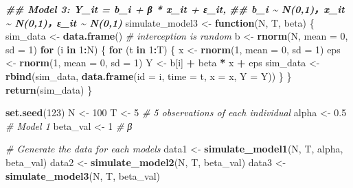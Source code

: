 \documentclass[
]{article}
\newenvironment{Shaded}{\begin{snugshade}}{\end{snugshade}}
\newcommand{\AttributeTok}[1]{\textcolor[rgb]{0.13,0.29,0.53}{#1}}
\newcommand{\CommentTok}[1]{\textcolor[rgb]{0.56,0.35,0.01}{\textit{#1}}}
\newcommand{\ControlFlowTok}[1]{\textcolor[rgb]{0.13,0.29,0.53}{\textbf{#1}}}
\newcommand{\DecValTok}[1]{\textcolor[rgb]{0.00,0.00,0.81}{#1}}
\newcommand{\DocumentationTok}[1]{\textcolor[rgb]{0.56,0.35,0.01}{\textbf{\textit{#1}}}}
\newcommand{\FloatTok}[1]{\textcolor[rgb]{0.00,0.00,0.81}{#1}}
\newcommand{\FunctionTok}[1]{\textcolor[rgb]{0.13,0.29,0.53}{\textbf{#1}}}
\newcommand{\NormalTok}[1]{#1}
\newcommand{\OtherTok}[1]{\textcolor[rgb]{0.56,0.35,0.01}{#1}}
\newcommand{\SpecialCharTok}[1]{\textcolor[rgb]{0.81,0.36,0.00}{\textbf{#1}}}
\begin{document}
\begin{Shaded}
\begin{Highlighting}[]
\DocumentationTok{\#\# Model 3: Y\_it = b\_i + β * x\_it + ε\_it,}
\DocumentationTok{\#\# b\_i \textasciitilde{} N(0,1)，x\_it \textasciitilde{} N(0,1)，ε\_it \textasciitilde{} N(0,1)}
\NormalTok{simulate\_model3 }\OtherTok{\textless{}{-}} \ControlFlowTok{function}\NormalTok{(N, T, beta) \{}
\NormalTok{  sim\_data }\OtherTok{\textless{}{-}} \FunctionTok{data.frame}\NormalTok{()}
  \CommentTok{\# interception is random }
\NormalTok{  b }\OtherTok{\textless{}{-}} \FunctionTok{rnorm}\NormalTok{(N, }\AttributeTok{mean =} \DecValTok{0}\NormalTok{, }\AttributeTok{sd =} \DecValTok{1}\NormalTok{)}
  \ControlFlowTok{for}\NormalTok{ (i }\ControlFlowTok{in} \DecValTok{1}\SpecialCharTok{:}\NormalTok{N) \{}
    \ControlFlowTok{for}\NormalTok{ (t }\ControlFlowTok{in} \DecValTok{1}\SpecialCharTok{:}\NormalTok{T) \{}
\NormalTok{      x }\OtherTok{\textless{}{-}} \FunctionTok{rnorm}\NormalTok{(}\DecValTok{1}\NormalTok{, }\AttributeTok{mean =} \DecValTok{0}\NormalTok{, }\AttributeTok{sd =} \DecValTok{1}\NormalTok{)}
\NormalTok{      eps }\OtherTok{\textless{}{-}} \FunctionTok{rnorm}\NormalTok{(}\DecValTok{1}\NormalTok{, }\AttributeTok{mean =} \DecValTok{0}\NormalTok{, }\AttributeTok{sd =} \DecValTok{1}\NormalTok{)}
\NormalTok{      Y }\OtherTok{\textless{}{-}}\NormalTok{ b[i] }\SpecialCharTok{+}\NormalTok{ beta }\SpecialCharTok{*}\NormalTok{ x }\SpecialCharTok{+}\NormalTok{ eps}
\NormalTok{      sim\_data }\OtherTok{\textless{}{-}} \FunctionTok{rbind}\NormalTok{(sim\_data, }\FunctionTok{data.frame}\NormalTok{(}\AttributeTok{id =}\NormalTok{ i, }\AttributeTok{time =}\NormalTok{ t, }\AttributeTok{x =}\NormalTok{ x, }\AttributeTok{Y =}\NormalTok{ Y))}
\NormalTok{    \}}
\NormalTok{  \}}
  \FunctionTok{return}\NormalTok{(sim\_data)}
\NormalTok{\}}

\FunctionTok{set.seed}\NormalTok{(}\DecValTok{123}\NormalTok{)}
\NormalTok{N }\OtherTok{\textless{}{-}} \DecValTok{100}  
\NormalTok{T }\OtherTok{\textless{}{-}} \DecValTok{5}    \CommentTok{\#  5 observations of each individual}
\NormalTok{alpha }\OtherTok{\textless{}{-}} \FloatTok{0.5}  \CommentTok{\# Model 1 }
\NormalTok{beta\_val }\OtherTok{\textless{}{-}} \DecValTok{1}  \CommentTok{\# β }

\CommentTok{\# Generate the data for each models}
\NormalTok{data1 }\OtherTok{\textless{}{-}} \FunctionTok{simulate\_model1}\NormalTok{(N, T, alpha, beta\_val)}
\NormalTok{data2 }\OtherTok{\textless{}{-}} \FunctionTok{simulate\_model2}\NormalTok{(N, T, beta\_val)}
\NormalTok{data3 }\OtherTok{\textless{}{-}} \FunctionTok{simulate\_model3}\NormalTok{(N, T, beta\_val)}


\end{Highlighting}
\end{Shaded}
\end{document}
